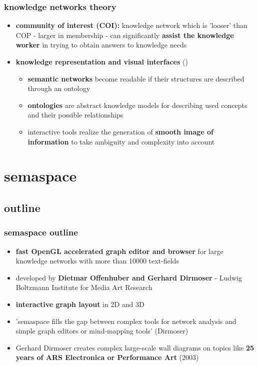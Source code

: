 \documentclass[blue]{beamer}
\begin{document}
\frame
{
\frametitle{\textbf{knowledge networks theory}}
\begin{itemize}
	\item \textbf{community of interest (COI):} knowledge network which is 'looser' than COP - larger in membership - can significantly \textbf{assist the knowledge worker} in trying to obtain answers to knowledge needs
	\item \textbf{knowledge representation and visual interfaces} ()
	\begin{itemize}
		\item \textbf{semantic networks} become readable if their structures are described through an ontology
		\item \textbf{ontologies} are abstract knowledge models for describing used concepts and their possible relationships
		\item interactive tools realize the generation of \textbf{smooth image of information} to take ambiguity and complexity into account
	\end{itemize}
\end{itemize}
}



\section{semaspace}
\subsection{outline}
\frame
{
\frametitle{\textbf{semaspace outline}}
\begin{itemize}
	\item \textbf{fast OpenGL accelerated graph editor and browser} for large knowledge networks with more than 10000 text-fields
	\item developed by \textbf{Dietmar Offenhuber and Gerhard Dirmoser} - Ludwig Boltzmann Institute for Media Art Research
	\item \textbf{interactive graph layout} in 2D and 3D
	\item 'semaspace fills the gap between complex tools for network analysis and simple graph editors or mind-mapping tools' (Dirmoser)
	\item Gerhard Dirmoser creates complex large-scale wall diagrams on topics like \textbf{25 years of ARS Electronica or Performance Art} (2003)
\end{itemize}
}
\end{document}
